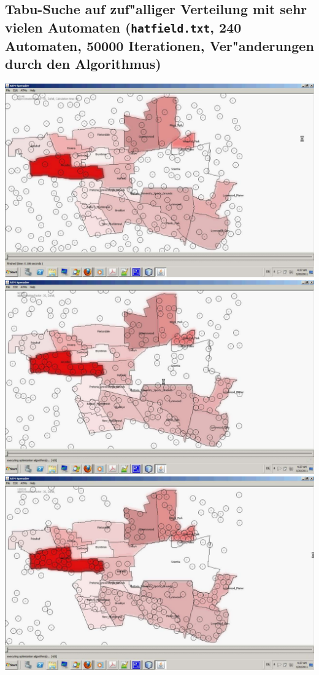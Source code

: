 \documentclass[12pt,a4paper]{article}
\begin{document}
\subsection{Tabu-Suche auf zuf"alliger Verteilung mit sehr vielen Automaten (\texttt{hatfield.txt}, 240 Automaten, 50000 Iterationen, Ver"anderungen durch den Algorithmus)}
\includegraphics[width=1.0\textwidth]{1.pdf}
\includegraphics[width=1.0\textwidth]{2.pdf}
\includegraphics[width=1.0\textwidth]{3.pdf}
\end{document}
